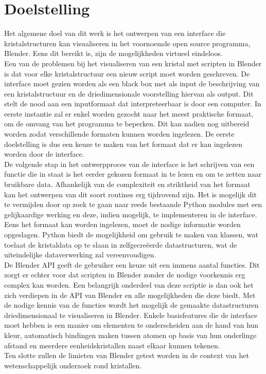 \section{Doelstelling}
Het algemene doel van dit werk is het ontwerpen van een interface die kristalstructuren kan visualiseren in het voornoemde open source programma, Blender. Eens dit bereikt is, zijn de mogelijkheden virtueel eindeloos. 
\\
Een van de problemen bij het visualiseren van een kristal met scripten in Blender is dat voor elke kristalstructuur een nieuw script moet worden geschreven. De interface moet gezien worden als een black box met als input de beschrijving van een kristalstructuur en de driedimensionale voorstelling hiervan als output. Dit stelt de nood aan een inputformaat dat interpreteerbaar is door een computer. In eerste instantie zal er enkel worden gezocht naar het meest praktische formaat, om de omvang van het programma te beperken. Dit kan nadien nog uitbereid worden zodat verschillende formaten kunnen worden ingelezen. De eerste doelstelling is dus een keuze te maken van het formaat dat er kan ingelezen worden door de interface.  
\\
De volgende stap in het ontwerpproces van de interface is het schrijven van een functie die in staat is het eerder gekozen formaat in te lezen en om te zetten naar bruikbare data. Afhankelijk van de complexiteit en striktheid van het formaat kan het ontwerpen van dit soort routines erg tijdrovend zijn. Het is mogelijk dit te vermijden door op zoek te gaan naar reeds bestaande Python modules met een gelijkaardige werking en deze, indien mogelijk, te implementeren in de interface. Eens het formaat kan worden ingelezen, moet de nodige informatie worden opgeslagen. Python biedt de mogelijkheid om gebruik te maken van klassen, wat toelaat de kristaldata op te slaan in zelfgecreëerde datastructuren, wat de uiteindelijke dataverwerking zal vereenvoudigen. 
\\
De Blender API geeft de gebruiker een keuze uit een immens aantal functies. Dit zorgt er echter voor dat scripten in Blender zonder de nodige voorkennis erg complex kan worden. Een belangrijk onderdeel van deze scriptie is dan ook het zich verdiepen in de API van Blender en alle mogelijkheden die deze biedt. Met de nodige kennis van de functies wordt het mogelijk de gemaakte datastructuren driedimensionaal te visualiseren in Blender. Enkele basisfeatures die de interface moet hebben is een manier om elementen te onderscheiden aan de hand van hun kleur, automatisch bindingen maken tussen atomen op basis van hun onderlinge afstand en meerdere eenheidskristallen naast elkaar kunnen tekenen.
\\
Ten slotte zullen de limieten van Blender getest worden in de context van het wetenschappelijk onderzoek rond kristallen.  


